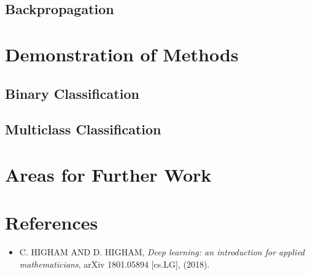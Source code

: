 \documentclass{article}
\begin{document}
    \subsection{Backpropagation}




\section{Demonstration of Methods}

    \subsection{Binary Classification}
    
    \subsection{Multiclass Classification}
    



\section{Areas for Further Work}    




\section*{References}

	\begin{itemize}
	
		\item[] C. HIGHAM AND D. HIGHAM, \textit{Deep learning: an introduction for applied mathematicians}, arXiv 1801.05894 [cs.LG], (2018).

	\end{itemize}
\end{document}
